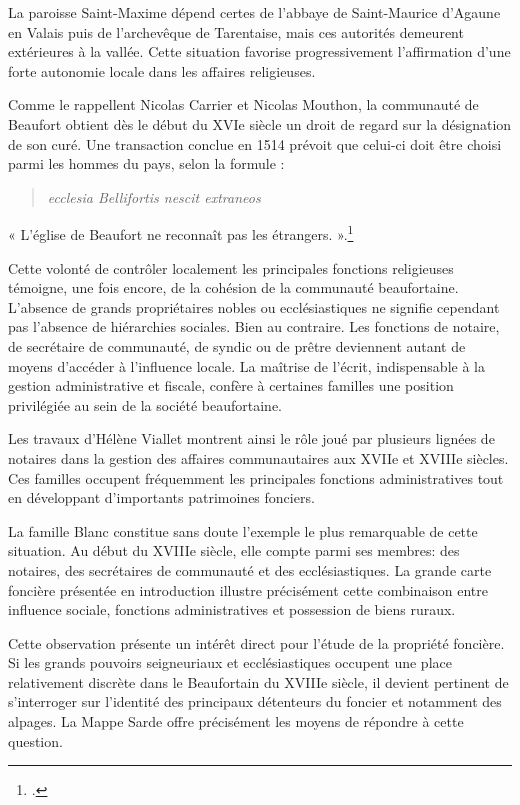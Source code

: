 \documentclass[12pt,a4paper]{report}
\begin{document}
La paroisse Saint-Maxime dépend certes de l'abbaye de Saint-Maurice d'Agaune en Valais puis de l'archevêque de Tarentaise, mais ces autorités demeurent extérieures à la vallée. Cette situation favorise progressivement l'affirmation d'une forte autonomie locale dans les affaires religieuses.

Comme le rappellent Nicolas Carrier et Nicolas Mouthon, la communauté de Beaufort obtient dès le début du XVIe siècle un droit de regard sur la désignation de son curé. Une transaction conclue en 1514 prévoit que celui-ci doit être choisi parmi les hommes du pays, selon la formule :

\begin{quote}
	\textit{ecclesia Bellifortis nescit extraneos}
\end{quote}

« L'église de Beaufort ne reconnaît pas les étrangers. ».\footcite[148--149]{CarrierMouthon2010PaysansAlpes}

\vspace{1em}

Cette volonté de contrôler localement les principales fonctions religieuses témoigne, une fois encore, de la cohésion de la communauté beaufortaine. L'absence de grands propriétaires nobles ou ecclésiastiques ne signifie cependant pas l'absence de hiérarchies sociales. Bien au contraire. Les fonctions de notaire, de secrétaire de communauté, de syndic ou de prêtre deviennent autant de moyens d'accéder à l'influence locale. La maîtrise de l'écrit, indispensable à la gestion administrative et fiscale, confère à certaines familles une position privilégiée au sein de la société beaufortaine.

Les travaux d'Hélène Viallet montrent ainsi le rôle joué par plusieurs lignées de notaires dans la gestion des affaires communautaires aux XVIIe et XVIIIe siècles. Ces familles occupent fréquemment les principales fonctions administratives tout en développant d'importants patrimoines fonciers.

La famille Blanc constitue sans doute l'exemple le plus remarquable de cette situation. Au début du XVIIIe siècle, elle compte parmi ses membres:  des notaires, des secrétaires de communauté et des ecclésiastiques. La grande carte foncière présentée en introduction illustre précisément cette combinaison entre influence sociale, fonctions administratives et possession de biens ruraux.


Cette observation présente un intérêt direct pour l'étude de la propriété foncière. Si les grands pouvoirs seigneuriaux et ecclésiastiques occupent une place relativement discrète dans le Beaufortain du XVIIIe siècle, il devient pertinent de s'interroger sur l'identité des principaux détenteurs du foncier et notamment des alpages. La Mappe Sarde offre précisément les moyens de répondre à cette question.
\end{document}
